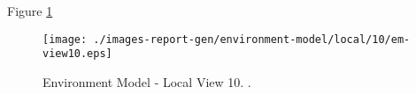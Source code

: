 
Figure \ref{fig:lu.uni.lassy.excalibur.examples.icrash-EM-view-local-10} 


\begin{figure}[htbp] 
\label{fig:lu.uni.lassy.excalibur.examples.icrash-EM}
\begin{center}
\texttt{[image: ./images-report-gen/environment-model/local/10/em-view10.eps]}
\end{center}
\caption[Environment Model - Local View 10 - ]{Environment Model - Local View 10. .}
\label{fig:lu.uni.lassy.excalibur.examples.icrash-EM-view-local-10}
\end{figure}
\vspace{0.5cm} 
